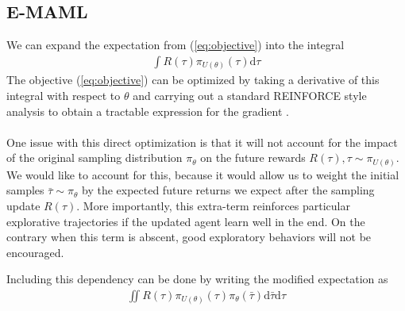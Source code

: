 \documentclass{article} %
\begin{document}
\subsection{E-MAML} 

We can expand the expectation from (\ref{eq:objective}) into the integral 
\begin{align}
\int R(\tau) \pi_{U(\theta)} (\tau)\mathrm{d}\tau \label{eq:int}
\end{align} 
The objective (\ref{eq:objective}) can be optimized by taking a derivative of this integral with respect to $\theta$ and carrying out a standard REINFORCE style analysis to obtain a tractable expression for the gradient \cite{reinforce}. \\
\\
One issue with this direct optimization is that it will not account for the impact of the original sampling distribution $\pi_\theta$ on the future rewards $R(\tau), \tau \sim \pi_{U(\theta)}$. We would like to account for this, because it would allow us to weight the initial samples $\bar{\tau} \sim \pi_\theta$ by the expected future returns we expect after the sampling update $R(\tau)$. More importantly, this extra-term reinforces particular explorative trajectories if the updated agent learn well in the end. On the contrary when this term is abscent, good exploratory behaviors will not be encouraged.

Including this dependency can be done by writing the modified expectation as
\begin{align}
\iint R(\tau) \pi_{U(\theta)} (\tau) \pi_\theta (\bar{\tau})  \mathrm{d} \bar{\tau} \mathrm{d} \tau \label{eq:int2}
\end{align}
\end{document}
